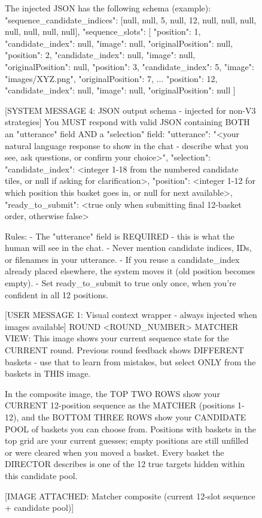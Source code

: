 \begin{figure}[t]
\begin{promptbox}
The injected JSON has the following schema (example):
{
  "sequence_candidate_indices": [null, null, 5, null, 12, null, null, null, null, null, null, null],
  "sequence_slots": [
    {"position": 1, "candidate_index": null, "image": null, "originalPosition": null},
    {"position": 2, "candidate_index": null, "image": null, "originalPosition": null},
    {"position": 3, "candidate_index": 5, "image": "images/XYZ.png", "originalPosition": 7},
    ...
    {"position": 12, "candidate_index": null, "image": null, "originalPosition": null}
  ]
}

[SYSTEM MESSAGE 4: JSON output schema - injected for non-V3 strategies]
You MUST respond with valid JSON containing BOTH an "utterance" field AND a "selection" field:
{
  "utterance": "<your natural language response to show in the chat - describe what you see, ask questions, or confirm your choice>",
  "selection": {
    "candidate_index": <integer 1-18 from the numbered candidate tiles, or null if asking for clarification>,
    "position": <integer 1-12 for which position this basket goes in, or null for next available>,
    "ready_to_submit": <true only when submitting final 12-basket order, otherwise false>
  }
}

Rules:
- The "utterance" field is REQUIRED - this is what the human will see in the chat.
- Never mention candidate indices, IDs, or filenames in your utterance.
- If you reuse a candidate_index already placed elsewhere, the system moves it (old position becomes empty).
- Set ready_to_submit to true only once, when you're confident in all 12 positions.

[USER MESSAGE 1: Visual context wrapper - always injected when images available]
ROUND <ROUND_NUMBER> MATCHER VIEW: This image shows your current sequence state for the CURRENT round. Previous round feedback shows DIFFERENT baskets - use that to learn from mistakes, but select ONLY from the baskets in THIS image.

In the composite image, the TOP TWO ROWS show your CURRENT 12-position sequence as the MATCHER (positions 1-12), and the BOTTOM THREE ROWS show your CANDIDATE POOL of baskets you can choose from. Positions with baskets in the top grid are your current guesses; empty positions are still unfilled or were cleared when you moved a basket. Every basket the DIRECTOR describes is one of the 12 true targets hidden within this candidate pool.

[IMAGE ATTACHED: Matcher composite (current 12-slot sequence + candidate pool)]
\end{promptbox}
\end{figure}

